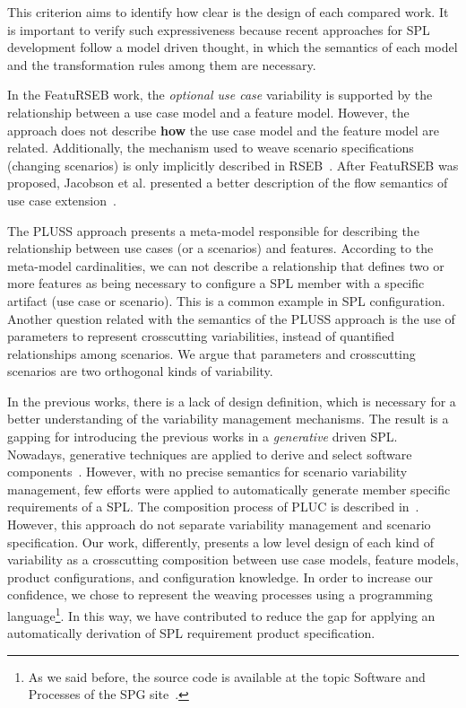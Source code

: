 This criterion aims to identify how clear is the design of each compared
work. It is important to verify such expressiveness because recent approaches
for SPL development follow a model driven thought, in which the semantics of
each model and the transformation rules among them are necessary.

In the FeatuRSEB work, the \emph{optional use case} variability is
supported by the relationship between a use case model and a feature
model. However, the approach does not describe {\bf how} the use
case model and the feature model are related. Additionally, the
mechanism used to weave scenario specifications (changing scenarios)
is only implicitly described in RSEB~\cite{jacobson-reuse-book}.
After FeatuRSEB was proposed, Jacobson et al. presented a better
description of the flow semantics of use case extension~\cite{jacobson-aosd-book}.

The PLUSS approach presents a meta-model responsible for describing
the relationship between use cases (or a scenarios) and features.
According  to the meta-model cardinalities, we can not describe a
relationship that defines two or more features as being necessary to
configure a SPL member with a specific artifact (use case or
scenario). This is a common example in SPL configuration. Another
question related with the semantics of the PLUSS approach is the use
of parameters to represent crosscutting variabilities, instead of
quantified relationships among scenarios. We argue that parameters
and crosscutting scenarios are two orthogonal kinds of variability. 

In the previous works, there is a lack of design definition, which
is necessary for a better understanding of the variability
management mechanisms. The result is a gapping for introducing the
previous works in a \emph{generative} driven SPL. Nowadays,
generative techniques are applied to derive and select software
components~\cite{czarnecki-book,greenfield-softwarefactories,butler-icse-2001,krueger-cacm-200712}. 
However, with no precise semantics for scenario variability management, few efforts were
applied to automatically generate member specific requirements of a
SPL. The composition process of PLUC is described in~\cite{fantechi-splc-2004}. 
However, this approach do not separate variability management and scenario 
specification. Our work, differently, presents a low level design of each
kind of variability as a crosscutting composition between use case models, feature models, product 
configurations, and configuration knowledge. In order to increase our confidence, we chose
to represent the weaving processes using a programming
language\footnote{As we said before, the source code is available at
the topic Software and Processes of the SPG site~\cite{spg-url}.}.
In this way, we have contributed to reduce the gap for applying an
automatically derivation of SPL requirement product specification.


